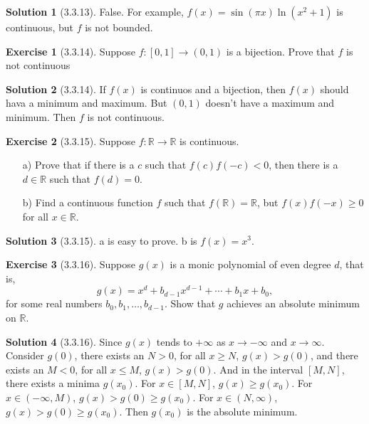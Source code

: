 \documentclass{article}
\theoremstyle{definition}
\newtheorem{exe}{Exercise}[section]
\newtheorem{sol}{Solution}[exe]
\begin{document}
\begin{sol}[3.3.13]
    False. For example, $f(x)=\sin (\pi x) \ln(x^2+1)$ is continuous, but $f$ is not bounded.
\end{sol}

\begin{exe}[3.3.14]
    Suppose \( f: [0, 1] \rightarrow (0, 1) \) is a bijection. Prove that \( f \) is not continuous
\end{exe}

\begin{sol}[3.3.14]

If $f(x)$ is continuos and  a bijection, then $f(x)$ should hava a minimum and maximum. But $(0,1)$ doesn't have a maximum and minimum. Then $f$ is not continuous.
\end{sol}


\begin{exe}[3.3.15]
    Suppose \( f: \mathbb{R} \rightarrow \mathbb{R} \) is continuous.

\begin{enumerate}
    \item[a)] Prove that if there is a \( c \) such that \( f(c) f(-c) < 0 \), then there is a \( d \in \mathbb{R} \) such that \( f(d) = 0 \).
    \item[b)] Find a continuous function \( f \) such that \( f(\mathbb{R}) = \mathbb{R} \), but \( f(x) f(-x) \geq 0 \) for all \( x \in \mathbb{R} \).
\end{enumerate}
\end{exe}

\begin{sol}[3.3.15]
    
a is easy to prove. b is $f(x)=x^3$. 
\end{sol}

\begin{exe}[3.3.16]
    Suppose \( g(x) \) is a monic polynomial of even degree \( d \), that is,
    \[
    g(x) = x^d + b_{d-1} x^{d-1} + \cdots + b_1 x + b_0,
    \]
    for some real numbers \( b_0, b_1, \ldots, b_{d-1} \). Show that \( g \) achieves an absolute minimum on \( \mathbb{R} \).
\end{exe}

\begin{sol}[3.3.16]

Since $g(x)$ tends to $+\infty$ as $x\to -\infty$ and $x\to \infty$. Consider $g(0)$, there exists an $N>0$, for all $x\geq N$, 
$g(x)>g(0)$, and there exists an $M<0$, for all $x\leq M$, $g(x)>g(0)$. And in the interval $[M,N]$, there exists a minima $g(x_0)$. For $x\in [M,N]$, $g(x)\geq g(x_0)$. 
For $x\in (-\infty,M)$, $g(x)> g(0)\geq g(x_0)$. For $x\in (N,\infty)$, $g(x)>g(0)\geq g(x_0)$. Then $g(x_0)$ is the absolute minimum.  
\end{sol}
\end{document}
